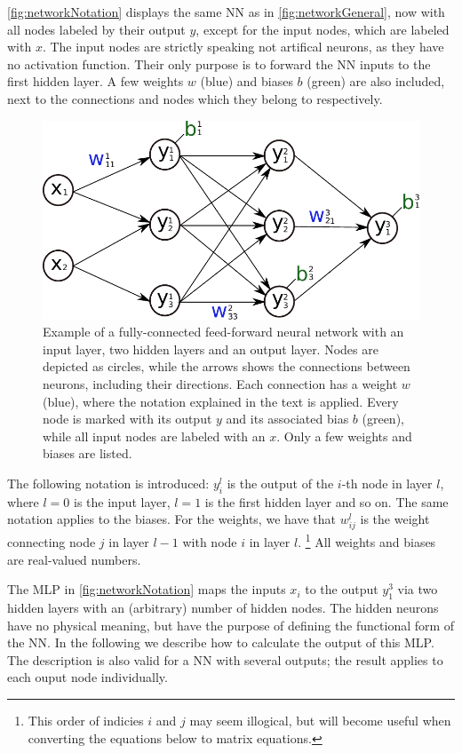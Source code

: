 \documentclass[twoside,english]{uiofysmaster}
\begin{document}
\autoref{fig:networkNotation} displays the same NN as in \autoref{fig:networkGeneral}, now with all nodes labeled by their
output $y$, except for the input nodes, which are labeled with $x$. The input nodes are strictly speaking not 
artifical neurons, as they have no activation function. Their only purpose is to forward the NN inputs to the 
first hidden layer. A few weights $w$ (blue) and biases $b$ (green) are also included, next to the connections and nodes
which they belong to respectively. 
\begin{figure}
 \begin{center}
  \includegraphics[width=\linewidth]{Figures/Theory/networkWithNotation.pdf}
  \caption{Example of a fully-connected feed-forward neural network with an input layer, two hidden layers
	   and an output layer. Nodes are depicted as circles, while the arrows shows the connections between neurons, 
	   including their directions. Each connection has a weight $w$ (blue), where the notation explained in the
	   text is applied. Every node is marked with its output $y$ and its associated bias $b$ (green), while all input nodes
	   are labeled with an $x$. Only a few weights and biases are listed.}
  \label{fig:networkNotation}
 \end{center}
\end{figure}
The following notation is introduced: $y_i^l$ is the output of the $i$-th node in layer $l$, where $l=0$ is the input layer, 
$l=1$ is the first hidden layer and so on. The same notation applies to the biases. For the weights, we have that
$w_{ij}^l$ is the weight connecting node $j$ in layer $l-1$ with node $i$ in layer $l$. 
\footnote{This order of indicies $i$ and $j$ may seem illogical, but will become useful when converting
the equations below to matrix equations.}
All weights and biases are real-valued numbers.

The MLP in \autoref{fig:networkNotation} maps the inputs $x_i$ to the output $y_1^3$ via two hidden layers
with an (arbitrary) number of hidden nodes. The hidden neurons have no physical meaning, but have the purpose
of defining the functional form of the NN. In the following we describe how to calculate the output of this MLP. The description
is also valid for a NN with several outputs; the result applies to each ouput node individually. 
\end{document}
